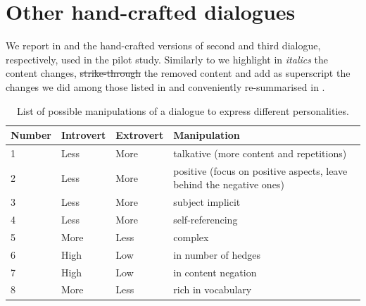 \documentclass[nomenclature, english, biblatex]{kththesis}
\begin{document}
\section{Other hand-crafted dialogues}
\label{app:hand_crafted}
We report in  and  the hand-crafted versions of second and third dialogue, respectively, used in the pilot study. Similarly to  we highlight in \textit{italics} the content changes, \sout{strike-through} the removed content and add as superscript the changes we did among those listed in  and conveniently re-summarised in .
\begin{table}
    \centering
    \begin{adjustbox}{max width=\textwidth}
        \begin{tabular}{|p{}|p{}|p{}|p{}|}
        \hline
        Number & Introvert & Extrovert & Manipulation \\
        \hline
        \hline
        1 & Less & More & talkative (more content and repetitions)\\
        \hline
        2 & Less & More & positive (focus on positive aspects, leave behind the negative ones)\\
        \hline
        3 & Less & More & subject implicit\\
        \hline
        4 & Less & More & self-referencing\\
        \hline
        5 & More & Less & complex\\
        \hline
        6 & High & Low & in number of hedges\\
        \hline
        7 & High & Low & in content negation\\
        \hline
        8 & More & Less & rich in vocabulary\\
        \hline
        \end{tabular}
    \end{adjustbox}
    \caption{List of possible manipulations of a dialogue to express different personalities.}
    \label{tab:hand_crafted_manipulations_app}
\end{table}
\end{document}

